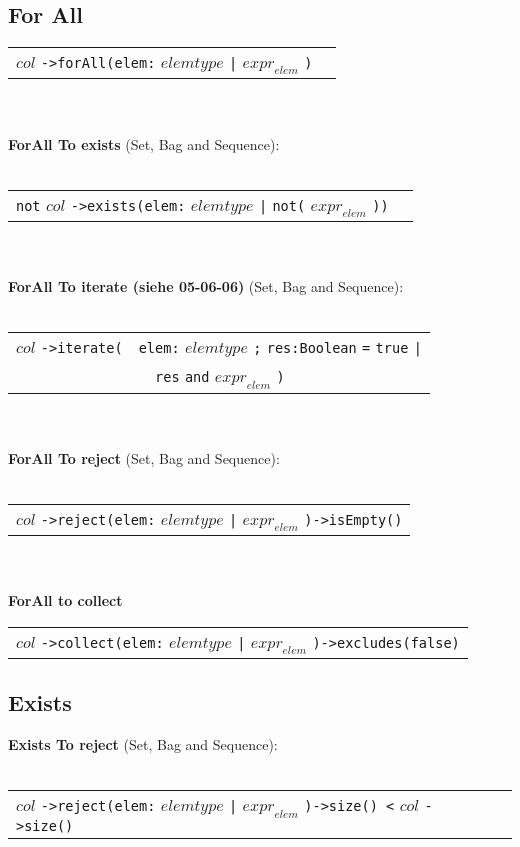 \subsection{For All}
\begin{tabular}{ll}
$\mathit{col}$ \verb+->forAll(+\verb+elem+\verb+:+
$\mathit{elemtype}$ \verb+|+ $\mathit{expr}_{\mathit{elem}}$
\verb+)+&
\end{tabular}\\\\
{\bf ForAll To exists} (Set, Bag and Sequence):\\\\
\begin{tabular}{ll}
\verb+not+ $\mathit{col}$ \verb+->exists(+\verb+elem+\verb+:+
$\mathit{elemtype}$ \verb+|+ \verb+not(+
$\mathit{expr}_{\mathit{elem}}$ \verb+))+&
\end{tabular}\\\\
{\bf ForAll To iterate (siehe 05-06-06)} (Set, Bag and Sequence):\\\\
\begin{tabular}{ll}
$\mathit{col}$ \verb+->iterate(+& \verb+elem+\verb+:+
$\mathit{elemtype}$ \verb+;+ \verb+res+\verb+:+\verb+Boolean+
\verb+=+
\verb+true+ \verb+|+\\
&\verb+  +\verb+res+ \verb+and+ $\mathit{expr}_{\mathit{elem}}$
\verb+)+
\end{tabular}\\\\
{\bf ForAll To reject} (Set, Bag and Sequence):\\\\
\begin{tabular}{l}
$\mathit{col}$ \verb+->reject(+\verb+elem+\verb+:+
$\mathit{elemtype}$ \verb+|+ $\mathit{expr}_{\mathit{elem}}$
\verb+)->isEmpty()+
\end{tabular}\\\\
{\bf ForAll to collect}
\begin{tabular}{l}
$\mathit{col}$ \verb+->collect(+\verb+elem+\verb+:+
$\mathit{elemtype}$ \verb+|+ $\mathit{expr}_{\mathit{elem}}$
\verb+)->excludes(false)+
\end{tabular}
\subsection{Exists}
{\bf Exists To reject} (Set, Bag and Sequence):\\\\
\begin{tabular}{ll}
$\mathit{col}$ \verb+->reject(+\verb+elem+\verb+:+
$\mathit{elemtype}$ \verb+|+ $\mathit{expr}_{\mathit{elem}}$
\verb+)->size() <+ $\mathit{col}$ \verb+->size()+&
\end{tabular}\\\\
